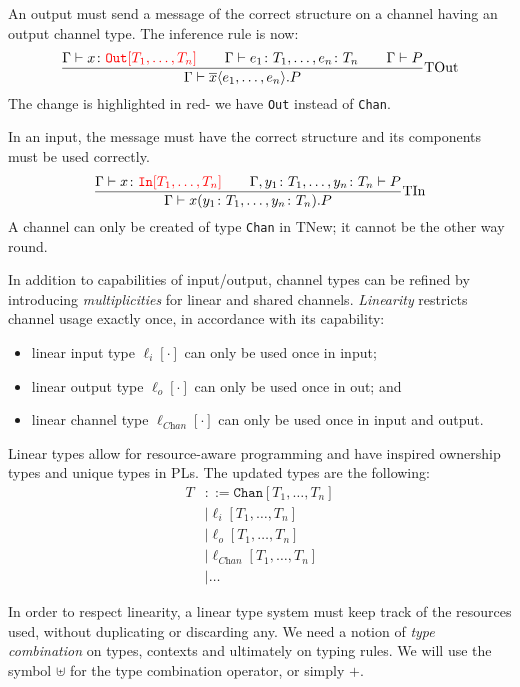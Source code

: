 \documentclass[a4paper, openany]{memoir}
\theoremstyle{definition}
\begin{document}
    An output must send a message of the correct structure on a channel having an output channel type. The inference rule is now:
    \[\frac{\Gamma \vdash x \colon {\color{red}\texttt{Out}[T_1, \dots, T_n]} \qquad \Gamma \vdash e_1 \colon T_1, \dots, e_n \colon T_n \qquad \Gamma \vdash P}{\Gamma \vdash \overline{x} \langle e_1, \dots, e_n \rangle.P} \textrm{TOut}\]
    The change is highlighted in red- we have \texttt{Out} instead of \texttt{Chan}. 

    In an input, the message must have the correct structure and its components must be used correctly.
    \[\frac{\Gamma \vdash x \colon {\color{red}\texttt{In}[T_1, \dots, T_n]} \qquad \Gamma, y_1 \colon T_1, \dots, y_n \colon T_n \vdash P}{\Gamma \vdash x(y_1 \colon T_1, \dots, y_n \colon T_n).P} \textrm{TIn}\]
    A channel can only be created of type \texttt{Chan} in TNew; it cannot be the other way round.

    In addition to capabilities of input/output, channel types can be refined by introducing \emph{multiplicities} for linear and shared channels. \emph{Linearity} restricts channel usage exactly once, in accordance with its capability:
    \begin{itemize}
        \item linear input type $\ell_i[\cdot]$ can only be used once in input;
        \item linear output type $\ell_o[\cdot]$ can only be used once in out; and
        \item linear channel type $\ell_{\textit{Chan}}[\cdot]$ can only be used once in input and output.
    \end{itemize}
    Linear types allow for resource-aware programming and have inspired ownership types and unique types in PLs. The updated types are the following:
    \begin{align*}
        T &::= \texttt{Chan}[T_1, \dots, T_n] \\
        &\mid \ell_i[T_1, \dots, T_n] \\
        &\mid \ell_o[T_1, \dots, T_n] \\
        &\mid \ell_{\textit{Chan}}[T_1, \dots, T_n] \\
        &\mid \dots
    \end{align*}

    In order to respect linearity, a linear type system must keep track of the resources used, without duplicating or discarding any. We need a notion of \emph{type combination} on types, contexts and ultimately on typing rules. We will use the symbol $\uplus$ for the type combination operator, or simply $+$.
\end{document}
